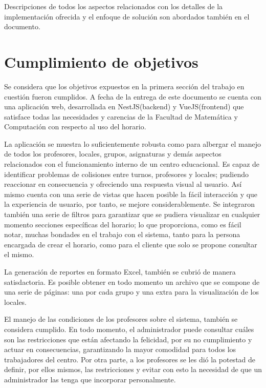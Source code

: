 Descripciones de todos los aspectos relacionados con los detalles de la implementación ofrecida y el enfoque de solución son abordados también en el documento.

\section{Cumplimiento de objetivos}

Se considera que los objetivos expuestos en la primera sección del trabajo en cuestión fueron cumplidos. A fecha de la entrega de este documento se cuenta con una aplicación web, desarrollada en NestJS(backend) y VueJS(frontend) que satisface todas las necesidades y carencias de la Facultad de Matemática y Computación con respecto al uso del horario. 

La aplicación se muestra lo suficientemente robusta como para albergar el manejo de todos los profesores, locales, grupos, asignaturas y demás aspectos relacionados con el funcionamiento interno de un centro educacional. Es capaz de identificar problemas de colisiones entre turnos, profesores y locales; pudiendo reaccionar en consecuencia y ofreciendo una respuesta visual al usuario. Así mismo cuenta con una serie de vistas que hacen posible la fácil interacción y que la experiencia de usuario, por tanto, se mejore considerablemente. Se integraron también una serie de filtros para garantizar que se pudiera visualizar en cualquier momento secciones específicas del horario; lo que proporciona, como es fácil notar, muchas bondades en el trabajo con el sistema, tanto para la persona encargada de crear el horario, como para el cliente que solo se propone consultar el mismo. 

La generación de reportes en formato Excel, también se cubrió de manera satisdactoria. Es posible obtener en todo momento un archivo que se compone de una serie de páginas: una por cada grupo y una extra para la visualización de los locales. 

El manejo de las condiciones de los profesores sobre el sistema, también se considera cumplido. En todo momento, el administrador puede consultar cuáles son las restricciones que están afectando la felicidad, por su no cumplimiento y actuar en consecuencias, garantizando la mayor comodidad para todos los trabajadores del centro. Por otra parte, a los profesores se les dió la potestad de definir, por ellos mismos, las restricciones y evitar con esto la necesidad de que un administrador las tenga que incorporar personalmente. 

